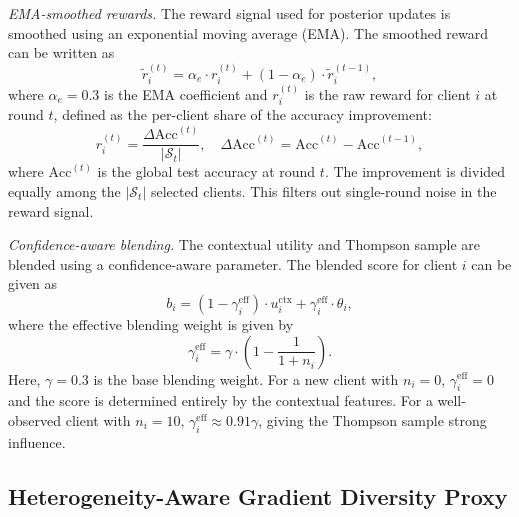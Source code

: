 \documentclass[journal]{IEEEtran}
\begin{document}
\textit{EMA-smoothed rewards.} The reward signal used for posterior updates is smoothed using an exponential moving average (EMA). The smoothed reward can be written as
\begin{equation}
\tilde{r}_i^{(t)} = \alpha_e \cdot r_i^{(t)} + (1 - \alpha_e) \cdot \tilde{r}_i^{(t-1)},
\label{eq:ema}
\end{equation}
where $\alpha_e = 0.3$ is the EMA coefficient and $r_i^{(t)}$ is the raw reward for client $i$ at round $t$, defined as the per-client share of the accuracy improvement:
\begin{equation}
r_i^{(t)} = \frac{\Delta \text{Acc}^{(t)}}{|\mathcal{S}_t|}, \quad \Delta \text{Acc}^{(t)} = \text{Acc}^{(t)} - \text{Acc}^{(t-1)},
\label{eq:reward}
\end{equation}
where $\text{Acc}^{(t)}$ is the global test accuracy at round $t$. The improvement is divided equally among the $|\mathcal{S}_t|$ selected clients. This filters out single-round noise in the reward signal.

\textit{Confidence-aware blending.} The contextual utility and Thompson sample are blended using a confidence-aware parameter. The blended score for client $i$ can be given as
\begin{equation}
b_i = (1 - \gamma_i^{\text{eff}}) \cdot u_i^{\text{ctx}} + \gamma_i^{\text{eff}} \cdot \theta_i,
\label{eq:blend}
\end{equation}
where the effective blending weight is given by
\begin{equation}
\gamma_i^{\text{eff}} = \gamma \cdot \left(1 - \frac{1}{1 + n_i}\right).
\label{eq:gamma_eff}
\end{equation}
Here, $\gamma = 0.3$ is the base blending weight. For a new client with $n_i = 0$, $\gamma_i^{\text{eff}} = 0$ and the score is determined entirely by the contextual features. For a well-observed client with $n_i = 10$, $\gamma_i^{\text{eff}} \approx 0.91\gamma$, giving the Thompson sample strong influence.

\subsection{Heterogeneity-Aware Gradient Diversity Proxy}
\end{document}
